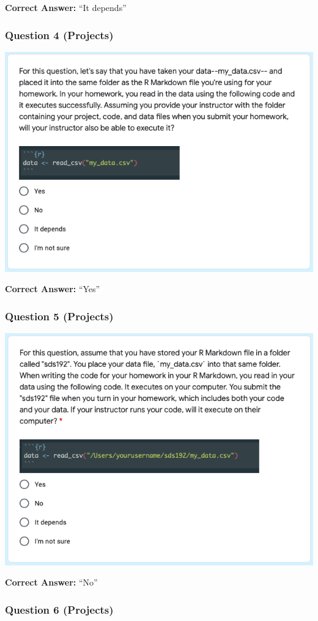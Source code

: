 \documentclass[12pt,twoside]{reedthesis}
\begin{document}
\textbf{Correct Answer:} ``It depends''

\hypertarget{question-4-projects}{%
\subsubsection{Question 4 (Projects)}\label{question-4-projects}}

\includegraphics[width=0.8\linewidth]{figure/appendix/test-4}

\textbf{Correct Answer:} ``Yes''

\hypertarget{question-5-projects}{%
\subsubsection{Question 5 (Projects)}\label{question-5-projects}}

\includegraphics[width=0.8\linewidth]{figure/appendix/test-5}

\textbf{Correct Answer:} ``No''

\hypertarget{question-6-projects}{%
\subsubsection{Question 6 (Projects)}\label{question-6-projects}}
\end{document}
